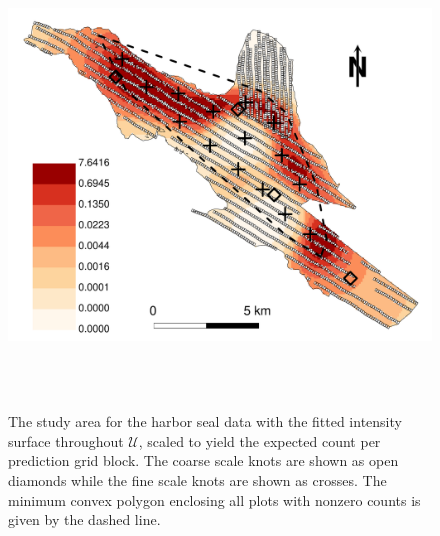 \documentclass[12pt, titlepage]{article}\usepackage[]{graphicx}\usepackage[]{color}
\def\cU{\mathcal{U}}
\begin{document}
	\begin{figure}[H]
	\begin{center}
	\includegraphics[height=350pt]{RealExampleIntSurfFit}
	\end{center}
	\caption{The study area for the harbor seal data with the fitted intensity surface throughout $\cU$, scaled to yield the expected count per prediction grid block. The coarse scale knots are shown as open diamonds while the fine scale knots are shown as crosses. The minimum convex polygon enclosing all plots with nonzero counts is given by the dashed line. \label{RealDataFittedSurface}}
	\end{figure}

\end{document}
